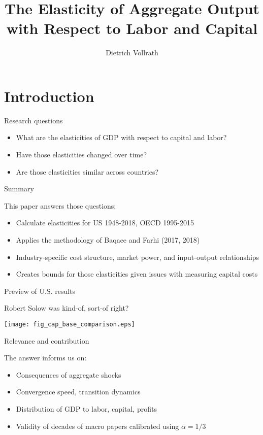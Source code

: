 \documentclass[10pt, xcolor=dvipsnames]{beamer}
\title[Aggregate elasticities]{The Elasticity of Aggregate Output with Respect to Labor and Capital}
\author[Vollrath]{Dietrich Vollrath \inst{1}}
\institute[UH]{\inst{1} University of Houston}
\date[April 2021]{}
\begin{document}
\maketitle

\section{Introduction}

\begin{frame}{Research questions}\label{define}

\begin{itemize}
  \item What are the elasticities of GDP with respect to capital and labor?
  \item Have those elasticities changed over time?
  \item Are those elasticities similar across countries? 
\end{itemize}

\end{frame}

\begin{frame}{Summary}

This paper answers those questions:
\begin{itemize}
  \item Calculate elasticities for US 1948-2018, OECD 1995-2015
  \item Applies the methodology of Baqaee and Farhi (2017, 2018)
  \item Industry-specific cost structure, market power, and input-output relationships
  \item Creates bounds for those elasticities given issues with measuring capital costs
\end{itemize}

\end{frame}

\begin{frame}{Preview of U.S. results}

Robert Solow was kind-of, sort-of right?

\begin{center}
\texttt{[image: fig\_cap\_base\_comparison.eps]}
\end{center}

\end{frame}

\begin{frame}{Relevance and contribution}

The answer informs us on:
\begin{itemize}
  \item Consequences of aggregate shocks
  \item Convergence speed, transition dynamics
  \item Distribution of GDP to labor, capital, profits
  \item Validity of decades of macro papers calibrated using $\alpha = 1/3$
\end{itemize}

\end{frame}
\end{document}
